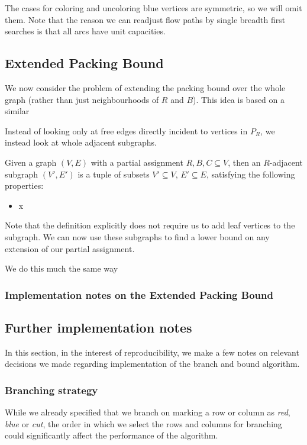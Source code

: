 	The cases for coloring and uncoloring blue vertices are symmetric, so we
	will omit them.
	Note that the reason we can readjust flow paths by single breadth first
	searches is that all arcs have unit capacities.

	\subsection{Extended Packing Bound}


	We now consider the problem of extending the packing bound over the whole
	graph (rather than just neighbourhoods of $R$ and $B$). This idea is based
	on a similar 

	Instead of looking only at free edges directly incident to vertices in
	$P_R$, we instead look at whole adjacent subgraphs.

	

	\begin{definition}
		Given a graph $(V, E)$ with a partial assignment $R, B, C \subseteq V$,
		then an $R$-adjacent subgraph $(V', E')$ is a tuple of subsets
		$V' \subseteq V$, $E' \subseteq E$, satisfying the following
		properties:
		\begin{itemize}
			\item x
		\end{itemize}
	\end{definition}

	Note that the definition explicitly does not require us to add leaf
	vertices to the subgraph. We can now use these subgraphs to find a lower
	bound on any extension of our partial assignment.

	We do this much the same way 

	\subsubsection{Implementation notes on the Extended Packing Bound}

	\subsection{Further implementation notes}

	In this section, in the interest of reproducibility, we make a few notes
	on relevant decisions we made regarding implementation of the branch and
	bound algorithm.

	\subsubsection{Branching strategy}
	While we already specified that we branch on marking a row or column as
	\textit{red}, \textit{blue} or \textit{cut}, the order in which we
	select the rows and columns for branching could significantly affect the
	performance of the algorithm.

